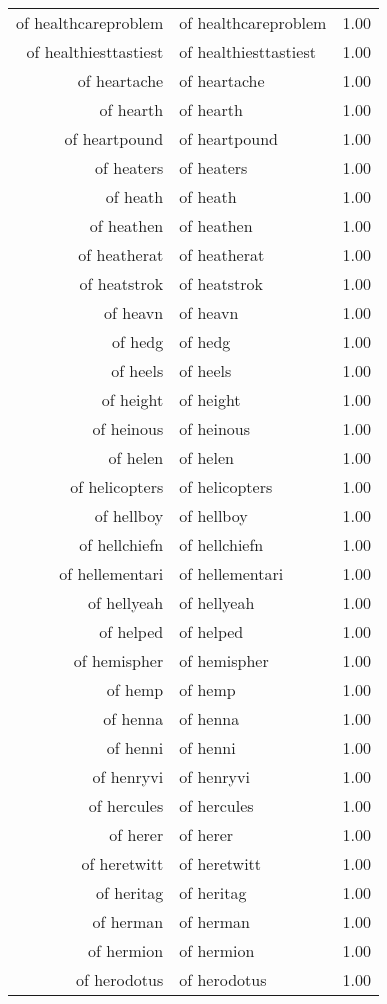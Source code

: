 \begin{table}[ht]
\begin{tabular}{rlr}
  of healthcareproblem & of healthcareproblem & 1.00 \\ 
  of healthiesttastiest & of healthiesttastiest & 1.00 \\ 
  of heartache & of heartache & 1.00 \\ 
  of hearth & of hearth & 1.00 \\ 
  of heartpound & of heartpound & 1.00 \\ 
  of heaters & of heaters & 1.00 \\ 
  of heath & of heath & 1.00 \\ 
  of heathen & of heathen & 1.00 \\ 
  of heatherat & of heatherat & 1.00 \\ 
  of heatstrok & of heatstrok & 1.00 \\ 
  of heavn & of heavn & 1.00 \\ 
  of hedg & of hedg & 1.00 \\ 
  of heels & of heels & 1.00 \\ 
  of height & of height & 1.00 \\ 
  of heinous & of heinous & 1.00 \\ 
  of helen & of helen & 1.00 \\ 
  of helicopters & of helicopters & 1.00 \\ 
  of hellboy & of hellboy & 1.00 \\ 
  of hellchiefn & of hellchiefn & 1.00 \\ 
  of hellementari & of hellementari & 1.00 \\ 
  of hellyeah & of hellyeah & 1.00 \\ 
  of helped & of helped & 1.00 \\ 
  of hemispher & of hemispher & 1.00 \\ 
  of hemp & of hemp & 1.00 \\ 
  of henna & of henna & 1.00 \\ 
  of henni & of henni & 1.00 \\ 
  of henryvi & of henryvi & 1.00 \\ 
  of hercules & of hercules & 1.00 \\ 
  of herer & of herer & 1.00 \\ 
  of heretwitt & of heretwitt & 1.00 \\ 
  of heritag & of heritag & 1.00 \\ 
  of herman & of herman & 1.00 \\ 
  of hermion & of hermion & 1.00 \\ 
  of herodotus & of herodotus & 1.00 \\ 

\end{tabular}
\end{table}
